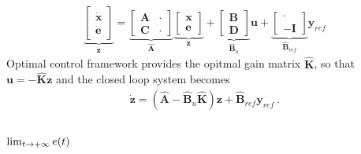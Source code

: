 \documentclass[letterpaper,10pt,english]{jupyterBook}
\begin{document}
\begin{equation*}
\begin{split}\underbrace{\begin{bmatrix} \dot{\mathbf{x}} \\ \dot{\mathbf{e}} \end{bmatrix}}_{\dot{\mathbf{z}}} = \underbrace{\begin{bmatrix} \mathbf{A} & \cdot \\ \mathbf{C} & \cdot \end{bmatrix}}_{\hat{\mathbf{A}}} \underbrace{\begin{bmatrix} \mathbf{x} \\ \mathbf{e} \end{bmatrix}}_{\mathbf{z}} + \underbrace{\begin{bmatrix} \mathbf{B} \\ \mathbf{D} \end{bmatrix}}_{\hat{\mathbf{B}}_u} \mathbf{u} + \underbrace{\begin{bmatrix} \cdot \\ -\mathbf{I} \end{bmatrix}}_{\hat{\mathbf{B}}_{ref}} \mathbf{y}_{ref}\end{split}
\end{equation*}
\sphinxAtStartPar
Optimal control framework provides the opitmal gain matrix \(\hat{\mathbf{K}}\), so that \(\mathbf{u} = - \hat{\mathbf{K}} \mathbf{z}\) and the closed loop system becomes
\begin{equation*}
\begin{split}\dot{\mathbf{z}} = \left( \hat{\mathbf{A}} - \hat{\mathbf{B}}_u \hat{\mathbf{K}} \right) \mathbf{z} + \hat{\mathbf{B}}_{ref} \mathbf{y}_{ref} \ .\end{split}
\end{equation*}\subsubsection*{\protect\(\lim_{t \rightarrow +\infty} e(t)\protect\)}
\end{document}
